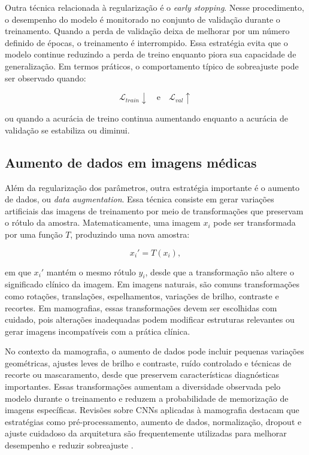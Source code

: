 \documentclass[
    12pt,
    openright,
    oneside,
    a4paper,
    english,
    brazil
]{abntex2}
\begin{document}
Outra técnica relacionada à regularização é o \textit{early stopping}. Nesse procedimento, o desempenho do modelo é monitorado no conjunto de validação durante o treinamento. Quando a perda de validação deixa de melhorar por um número definido de épocas, o treinamento é interrompido. Essa estratégia evita que o modelo continue reduzindo a perda de treino enquanto piora sua capacidade de generalização. Em termos práticos, o comportamento típico de sobreajuste pode ser observado quando:

\[
\mathcal{L}_{train} \downarrow
\quad \text{e} \quad
\mathcal{L}_{val} \uparrow
\]

ou quando a acurácia de treino continua aumentando enquanto a acurácia de validação se estabiliza ou diminui.

\subsection{Aumento de dados em imagens médicas}
\label{subsec:aumento_dados_imagens_medicas}

Além da regularização dos parâmetros, outra estratégia importante é o aumento de dados, ou \textit{data augmentation}. Essa técnica consiste em gerar variações artificiais das imagens de treinamento por meio de transformações que preservam o rótulo da amostra. Matematicamente, uma imagem \(x_i\) pode ser transformada por uma função \(T\), produzindo uma nova amostra:

\[
x_i' = T(x_i),
\]

em que \(x_i'\) mantém o mesmo rótulo \(y_i\), desde que a transformação não altere o significado clínico da imagem. Em imagens naturais, são comuns transformações como rotações, translações, espelhamentos, variações de brilho, contraste e recortes. Em mamografias, essas transformações devem ser escolhidas com cuidado, pois alterações inadequadas podem modificar estruturas relevantes ou gerar imagens incompatíveis com a prática clínica.

No contexto da mamografia, o aumento de dados pode incluir pequenas variações geométricas, ajustes leves de brilho e contraste, ruído controlado e técnicas de recorte ou mascaramento, desde que preservem características diagnósticas importantes. Essas transformações aumentam a diversidade observada pelo modelo durante o treinamento e reduzem a probabilidade de memorização de imagens específicas. Revisões sobre CNNs aplicadas à mamografia destacam que estratégias como pré-processamento, aumento de dados, normalização, dropout e ajuste cuidadoso da arquitetura são frequentemente utilizadas para melhorar desempenho e reduzir sobreajuste \cite{abdelhafiz2019}.
\end{document}
